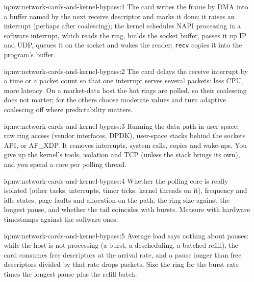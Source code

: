 \begin{solution}{iq:nw:network-cards-and-kernel-bypass:1}
The card writes the frame by DMA into a buffer named by the next receive descriptor and marks it done; it raises an interrupt (perhaps
after coalescing); the kernel schedules NAPI processing in a software interrupt, which reads the ring, builds the socket buffer, passes
it up IP and UDP, queues it on the socket and wakes the reader; \texttt{recv} copies it into the program's buffer.
\end{solution}

\begin{solution}{iq:nw:network-cards-and-kernel-bypass:2}
The card delays the receive interrupt by a time or a packet count so that one interrupt serves several packets: less CPU, more latency.
On a market-data host the hot rings are polled, so their coalescing does not matter; for the others choose moderate values and turn
adaptive coalescing off where predictability matters.
\end{solution}

\begin{solution}{iq:nw:network-cards-and-kernel-bypass:3}
Running the data path in user space: raw ring access (vendor interfaces, DPDK), user-space stacks behind the sockets API, or AF\_XDP.
It removes interrupts, system calls, copies and wake-ups. You give up the kernel's tools, isolation and TCP (unless the stack brings
its own), and you spend a core per polling thread.
\end{solution}

\begin{solution}{iq:nw:network-cards-and-kernel-bypass:4}
Whether the polling core is really isolated (other tasks, interrupts, timer ticks, kernel threads on it), frequency and idle states,
page faults and allocation on the path, the ring size against the longest pause, and whether the tail coincides with bursts. Measure
with hardware timestamps against the software ones.
\end{solution}

\begin{solution}{iq:nw:network-cards-and-kernel-bypass:5}
Average load says nothing about pauses: while the host is not processing (a burst, a descheduling, a batched refill), the card consumes
free descriptors at the arrival rate, and a pause longer than free descriptors divided by that rate drops packets. Size the ring for the
burst rate times the longest pause plus the refill batch.
\end{solution}

